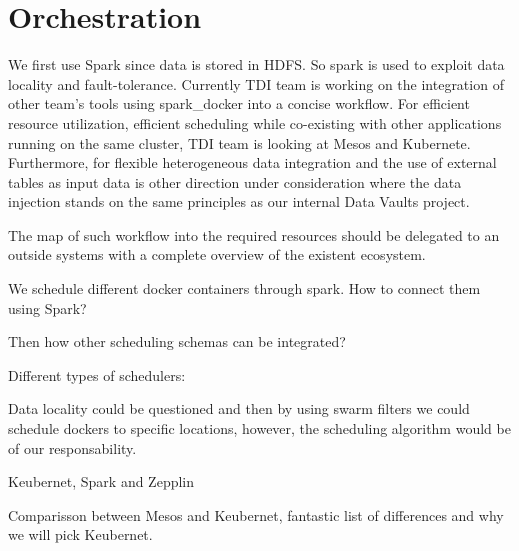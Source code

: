\section{Orchestration}
\label{orchestration}

We first use Spark since data is stored in HDFS.
So spark is used to exploit data locality and fault-tolerance.
Currently TDI team is working on the integration of other team’s tools using spark\_docker into a concise
workflow. For efficient resource utilization, efficient scheduling while co-existing with other applications
running on the same cluster, TDI team is looking at Mesos and Kubernete. Furthermore, for flexible heterogeneous
data integration and the use of external tables as input data is other direction under consideration where
the data injection stands on the same principles as our internal Data Vaults project.

The map of such workflow into the required resources should be delegated to an outside
systems with a complete overview of the existent ecosystem.

We schedule different docker containers through spark.
How to connect them using Spark?

Then how other scheduling schemas can be integrated?

Different types of schedulers:


Data locality could be questioned and then by using swarm filters we could schedule dockers to
specific locations, however, the scheduling algorithm would be of our responsability.

Keubernet, Spark and Zepplin

Comparisson between Mesos and Keubernet, fantastic list of differences and why we will pick Keubernet.
